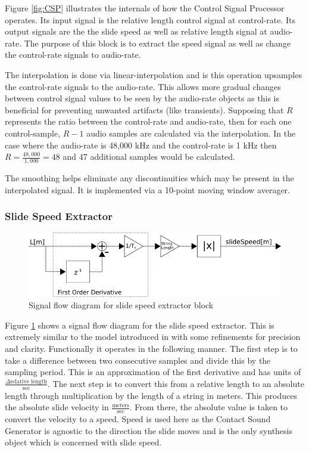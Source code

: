 \documentclass[../main.tex]{subfiles}
\begin{document}
Figure \ref{fig:CSP} illustrates the internals of how the Control Signal Processor operates. Its input signal is the relative length control signal at control-rate. Its output signals are the the slide speed as well as relative length signal at audio-rate. The purpose of this block is to extract the speed signal as well as change the control-rate signals to audio-rate.

The interpolation is done via linear-interpolation and is this operation upsamples the control-rate signals to the audio-rate. This allows more gradual changes between control signal values to be seen by the audio-rate objects as this is beneficial for preventing unwanted artifacts (like transients). Supposing that $R$ represents the ratio between the control-rate and audio-rate, then for each one control-sample, $R-1$ audio samples are calculated via the interpolation. In the case where the audio-rate is 48,000 kHz and the control-rate is 1 kHz then $R = \frac{48,000}{1,000} = 48$ and 47 additional samples would be calculated.

The smoothing helps eliminate any discontinuities which may be present in the interpolated signal. It is implemented via a 10-point moving window averager.

\subsubsection{Slide Speed Extractor}

\begin{figure}[h]
    \centering
    \includegraphics[scale=.5]{./images/diagrams/slideSpeedExtractor.png}
    \caption{Signal flow diagram for slide speed extractor block}
    \label{fig:SSE}
\end{figure}

Figure \ref{fig:SSE} shows a signal flow diagram for the slide speed extractor. This is extremely similar to the model introduced in  with some refinements for precision and clarity. Functionally it operates in the following manner. The first step is to take a difference between two consecutive samples and divide this by the sampling period. This is an approximation of the first derivative and has units of $\frac{\Delta \text{relative length}}{\text{sec}}$. The next step is to convert this from a relative length to an absolute length through multiplication by the length of a string in meters. This produces the absolute slide velocity in $\frac{\text{meters}}{\text{sec}}$. From there, the absolute value is taken to convert the velocity to a speed. Speed is used here as the Contact Sound Generator is agnostic to the direction the slide moves and is the only synthesis object which is concerned with slide speed.
\end{document}
